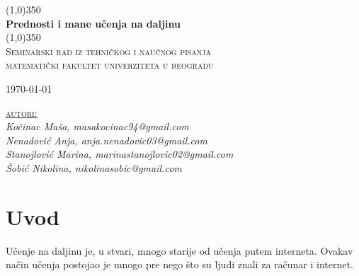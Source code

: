 \documentclass{article}
\date{\displaydate{date}}
\begin{document}
\begin{titlepage}
    \begin{center}
        \line(1,0){350}\\
        [0.25in] %
        \huge{\bfseries Prednosti i mane učenja na daljinu}\\
        [2mm]
        \line(1,0){350}\\
        [1.5cm]
        \textsc{\LARGE Seminarski rad iz tehničkog i naučnog pisanja}
        \textsc{\\ \Large matematički fakultet univerziteta u beogradu}\\
        [8cm]
        
    \end{center}
    

    \makeatletter
    \raggedleft\Large{\today}
    \makeatother
    
    \begin{flushright}
        \textsc{\large{\underline {autori:}}\\}
        \textit{
        \large Kočinac Maša, masakocinac94@gmail.com\\
        \large Nenadović Anja, anja.nenadovic03@gmail.com\\
        \large Stanojlović Marina, marinastanojlovic02@gmail.com\\
        \large Šobić Nikolina, nikolinasobic@gmail.com\\
        }
    \end{flushright}
    
\end{titlepage}




\tableofcontents 

\cleardoublepage
\section {Uvod}

\textbf{}

Učenje na daljinu je, u stvari, mnogo starije od učenja putem interneta. Ovakav način učenja postojao je mnogo pre nego što su ljudi znali za računar i internet.
\end{document}
